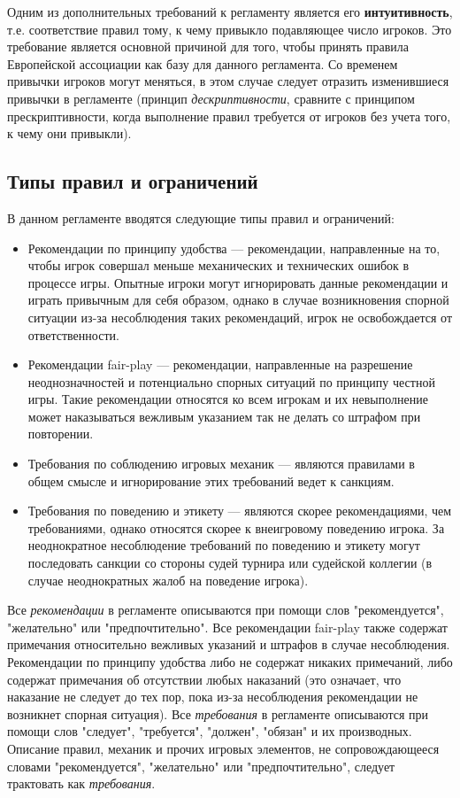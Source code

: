 Одним из дополнительных требований к регламенту является его \textbf{интуитивность}, т.е. соответствие правил тому, к чему привыкло подавляющее число игроков. Это требование является основной причиной для того, чтобы принять правила Европейской ассоциации как базу для данного регламента. Со временем привычки игроков могут меняться, в этом случае следует отразить изменившиеся привычки в регламенте (принцип \textit{дескриптивности}, сравните с принципом прескриптивности, когда выполнение правил требуется от игроков без учета того, к чему они привыкли).

\subsection{Типы правил и ограничений}

В данном регламенте вводятся следующие типы правил и ограничений:
\begin{itemize}
	\item Рекомендации по принципу удобства --- рекомендации, направленные на то, чтобы игрок совершал меньше механических и технических ошибок в процессе игры. Опытные игроки могут игнорировать данные рекомендации и играть привычным для себя образом, однако в случае возникновения спорной ситуации из-за несоблюдения таких рекомендаций, игрок не освобождается от ответственности.
	\item Рекомендации fair-play --- рекомендации, направленные на разрешение неоднозначностей и потенциально спорных ситуаций по принципу честной игры. Такие рекомендации относятся ко всем игрокам и их невыполнение может наказываться вежливым указанием так не делать со штрафом при повторении.
	\item Требования по соблюдению игровых механик --- являются правилами в общем смысле и игнорирование этих требований ведет к санкциям.
	\item Требования по поведению и этикету --- являются скорее рекомендациями, чем требованиями, однако относятся скорее к внеигровому поведению игрока. За неоднократное несоблюдение требований по поведению и этикету могут последовать санкции со стороны судей турнира или судейской коллегии (в случае неоднократных жалоб на поведение игрока).
\end{itemize}

Все \textit{рекомендации} в регламенте описываются при помощи слов "рекомендуется", "желательно" или "предпочтительно". Все рекомендации fair-play также содержат примечания относительно вежливых указаний и штрафов в случае несоблюдения. Рекомендации по принципу удобства либо не содержат никаких примечаний, либо содержат примечания об отсутствии любых наказаний (это означает, что наказание не следует до тех пор, пока из-за несоблюдения рекомендации не возникнет спорная ситуация). Все \textit{требования} в регламенте описываются при помощи слов "следует", "требуется", "должен", "обязан" и их производных. Описание правил, механик и прочих игровых элементов, не сопровождающееся словами "рекомендуется", "желательно" или "предпочтительно", следует трактовать как \textit{требования}.

